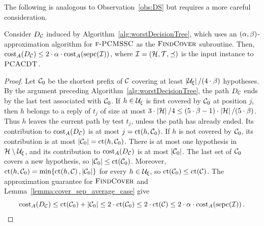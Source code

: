The following is analogous to Observation~\ref{obs:DS} but requires a more careful consideration.
\begin{observation} \label{obs:DS-average}
    Consider $D_{\cC}$ induced by Algorithm~\ref{alg:worstDecisionTree}, which uses an $\br{\alpha,\beta}$-approximation algorithm for $\ProblemPCMSSC$ as the $\blackBox$ subroutine.
    Then, $\COSTA\br{D_{\cC}} \leq 2\cdot\alpha \cdot \COSTA\br{\sepcover{\cI}}$, where $\cI=\br{\cH,\cT,\preceq}$ is the input instance to $\ProblemPCACDT$.
\end{observation}
\begin{proof}
    Let $\cC_0$ be the shortest prefix of $\cC$ covering at least $\spr{\cU_{\xi}}/(4\cdot\beta)$ hypotheses. By the argument preceding Algorithm~\ref{alg:worstDecisionTree}, the path $D_{\cC}$ ends by the last test associated with $\cC_0$. If $h\in\cU_{\xi}$ is first covered by $\cC_0$ at position $j$, then $h$ belongs to a reply of $t_j$ of size at most $3\cdot\spr{\cH}/4\leq (5\cdot\beta-1)\cdot\spr{\cH}/(5\cdot\beta)$. Thus $h$ leaves the current path by test $t_j$, unless the path has already ended. Its contribution to $\COSTA\br{D_{\cC}}$ is at most $j=\coverageTime\br{h,\cC_0}$. If $h$ is not covered by $\cC_0$, its contribution is at most $\spr{\cC_0}=\coverageTime\br{h,\cC_0}$.
    There is at most one hypothesis in $\cH\setminus\cU_{\xi}$, and its contribution to $\COSTA\br{D_{\cC}}$ is at most $\spr{\cC_0}$. The last set of $\cC_0$ covers a new hypothesis, so $\spr{\cC_0}\leq\coverageTime\br{\cC_0}$. Moreover, $\coverageTime\br{h,\cC_0}=\min\brc{\coverageTime\br{h,\cC},\spr{\cC_0}}$ for every $h\in\cU_{\xi}$, so $\coverageTime\br{\cC_0}\leq\coverageTime\br{\cC}$. The approximation guarantee for $\blackBox$ and Lemma~\ref{lemma:cover_sep_average_case} give
    \[
    \COSTA\br{D_{\cC}}
    \leq \coverageTime\br{\cC_0}+\spr{\cC_0}
    \leq 2\cdot\coverageTime\br{\cC_0}
    \leq 2\cdot\coverageTime\br{\cC}
    \leq 2\cdot\alpha\cdot\COSTA\br{\sepcover{\cI}}. \qedhere
    \]
\end{proof}

